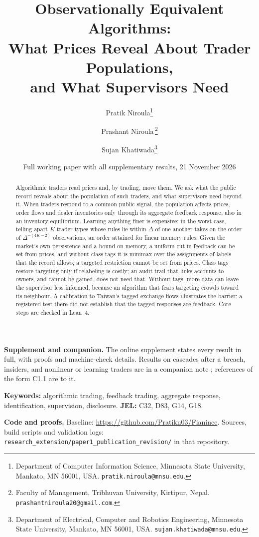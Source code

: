 \documentclass[12pt]{article}
\title{Observationally Equivalent Algorithms:\\ What Prices Reveal About Trader Populations,\\ and What Supervisors Need}
\author{Pratik Niroula\thanks{Department of Computer Information Science, Minnesota State University, Mankato, MN 56001, USA. \texttt{pratik.niroula@mnsu.edu}.}
\and Prashant Niroula\,\thanks{Faculty of Management, Tribhuvan University, Kirtipur, Nepal. \texttt{prashantniroula20@gmail.com}.}
\and Sujan Khatiwada\thanks{Department of Electrical, Computer and Robotics Engineering, Minnesota State University, Mankato, MN 56001, USA. \texttt{sujan.khatiwada@mnsu.edu}.}}
\date{Full working paper with all supplementary results, 21 November 2026}
\theoremstyle{definition}
\theoremstyle{remark}
\begin{document}
\maketitle
\thispagestyle{empty}\pagestyle{empty}
\begingroup\singlespacing\small

\begin{abstract}
\noindent Algorithmic traders read prices and, by trading, move them. We ask what the public record reveals about the population of such traders, and what supervisors need beyond it. When traders respond to a common public signal, the population affects prices, order flows and dealer inventories only through its aggregate feedback response, also in an inventory equilibrium. Learning anything finer is expensive: in the worst case, telling apart $K$ trader types whose rules lie within $\Delta$ of one another takes on the order of $\Delta^{-(4K-2)}$ observations, an order attained for linear memory rules. Given the market's own persistence and a bound on memory, a uniform cut in feedback can be set from prices, and without class tags it is minimax over the assignments of labels that the record allows; a targeted restriction cannot be set from prices. Class tags restore targeting only if relabeling is costly; an audit trail that links accounts to owners, and cannot be gamed, does not need that. Without tags, more data can leave the supervisor less informed, because an algorithm that fears targeting crowds toward its neighbour. A calibration to Taiwan's tagged exchange flows illustrates the barrier; a registered test there did not establish that the tagged responses are feedback. Core steps are checked in Lean~4.
\end{abstract}

\noindent\textbf{Supplement and companion.} The online supplement states every result in full, with proofs and machine-check details. Results on cascades after a breach, insiders, and nonlinear or learning traders are in a companion note \citep{niroula2026c}; references of the form C1.1 are to it.

\noindent\textbf{Keywords:} algorithmic trading, feedback trading, aggregate response, identification, supervision, disclosure. \textbf{JEL:} C32, D83, G14, G18.

\noindent\textbf{Code and proofs.} Baseline: \url{https://github.com/Pratikn03/Fianince}. Sources, build scripts and validation logs: \nolinkurl{research_extension/paper1_publication_revision/} in that repository.

\endgroup
\newpage
\pagestyle{fancy}
\setcounter{page}{1}
\end{document}
